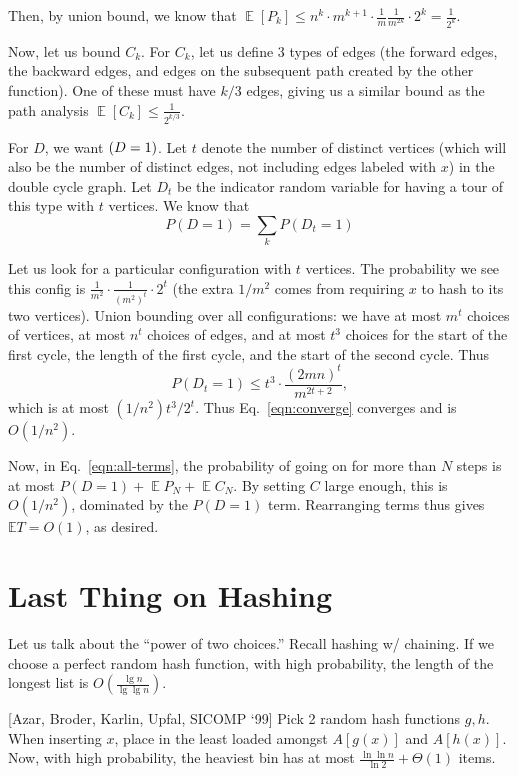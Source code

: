 \documentclass[11pt]{article}
\DeclareMathOperator*{\E}{\mathbb{E}}
\let\Pr\relax
\DeclareMathOperator*{\Pr}{\mathbb{P}}
\begin{document}
Then, by union bound, we know that $\E[P_k] \leq n^k \cdot m^{k+1} \cdot \frac{1}{m} \frac{1}{m^{2k}} \cdot 2^k=\frac{1}{2^k}$.

Now, let us bound $C_k$. For $C_k$, let us define 3 types of edges (the forward edges,
the backward edges, and edges on the subsequent path created by the other function).
One of these must have $k/3$ edges, giving us a similar bound as the path analysis $\E[C_k] \leq \frac{1}{2^{k/3}}$.

For $D$, we want $\Pr(D = 1)$. Let $t$ denote the number of distinct vertices (which will also be the number of distinct edges, not including edges labeled with $x$) in the double cycle graph. 
Let $D_t$ be the indicator random variable for having a tour of this type with $t$ vertices. We know that
\begin{equation}
P(D = 1) = \sum_k P(D_t = 1) \label{eqn:converge}
\end{equation}

Let us look for a particular configuration with $t$ vertices. The probability we see this
config is $\frac{1}{m^2} \cdot \frac{1}{(m^2)^t} \cdot 2^t$ (the extra $1/m^2$ comes from requiring $x$ to hash to its two vertices).
Union bounding over all configurations: we have at most $m^t$ choices of vertices, at most $n^t$
choices of edges, and at most $t^3$ choices for the start of the first cycle, the length of the first cycle, and the start of the second cycle. Thus
$$
P(D_t = 1) \le t^3 \cdot \frac{(2mn)^t}{m^{2t+2}} ,
$$
which is at most $(1/n^2) t^3/2^t$. Thus Eq.\ \eqref{eqn:converge} converges and is $O(1/n^2)$.

Now, in Eq.\ \eqref{eqn:all-terms}, the probability of going on for more than $N$ steps is at most $P(D=1) + \E P_N + \E C_N$. By setting $C$ large enough, this is $O(1/n^2)$, dominated by the $P(D=1)$ term. Rearranging terms thus gives $\mathbb{E} T = O(1)$, as desired.



\section{Last Thing on Hashing}

Let us talk about the ``power of two choices.'' Recall hashing w/ chaining. If we choose a perfect random
hash function, with high probability, the length of the longest list is $O\left(\frac{\lg{n}}{\lg\lg{n}}\right)$.

[Azar, Broder, Karlin, Upfal, SICOMP `99] Pick 2 random hash functions $g, h$. When inserting $x$,
place in the least loaded amongst $A[g(x)]$ and $A[h(x)]$. Now, with high probability, the heaviest
bin has at most $\frac{\ln{\ln{n}}}{\ln{2}} + \Theta(1)$ items.
\end{document}
